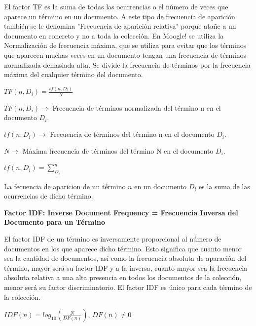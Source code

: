 \documentclass[a4paper,12pt]{article}
\begin{document}
	El factor TF es la suma de todas las ocurrencias o el número de veces que aparece un término en un documento. A este tipo de frecuencia de aparición también se le denomina "Frecuencia de aparición relativa" porque atañe a un documento en concreto y no a toda la colección. En Moogle!  se utiliza la Normalización de frecuencia máxima, que se utiliza para evitar que los términos que aparecen muchas veces en un documento tengan una frecuencia de términos normalizada demasiada alta. Se divide la frecuencia de términos por la frecuencia máxima del cualquier término del documento.
	
	\begin{center}
		$TF(n, D_i) = \frac{tf(n, D_i)}{N}$
	\end{center}
			
	$TF(n, D_i) \rightarrow$ Frecuencia de términos normalizada del término n en el documento $D_i$.
	
	$tf(n, D_i) \rightarrow$ Frecuencia de términos del término n en el documento $D_i$.
	
	$N \rightarrow$ Máxima frecuencia de términos del término N en el documento $D_i$.
		
	\vspace{0.5cm}
			
	\begin{center}
		$tf(n, D_i) = \sum_{D_i}^{n}$
	\end{center}
	La fecuencia de aparicion de un término $n$ en un documento $D_i$ es la suma de las ocurrencias de dicho término.
	
	\vspace{0.3cm}
	
	\textbf {Factor IDF: Inverse Document Frequency = Frecuencia Inversa del Documento para un Término}
	 
	\vspace{0.3cm}
	 
	El factor IDF de un término es inversamente proporcional al número de documentos en los que aparece dicho término. Esto significa que cuanto menor sea la cantidad de documentos, así como la frecuencia absoluta de aparación del término, mayor será su factor IDF y a la inversa, cuanto mayor sea la frecuencia absoluta relativa a una alta presencia en todos los documentos de la colección, menor será su factor discriminatorio. El factor IDF es único para cada término de la colección.
	
	\begin{center}
		$IDF(n) = log_{10} \left (\frac{N}{DF(n)} \right)$,	$DF(n) \neq 0$
	\end{center}
	
\end{document}
